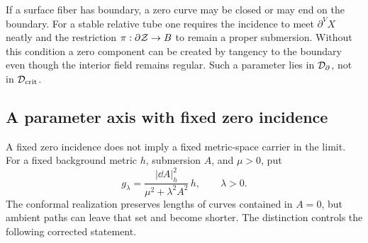 If a surface fiber has boundary, a zero curve may be closed or may end on the
boundary.  For a stable relative tube one requires the incidence to meet
$\partial^VX$ neatly and the restriction
$\pi:\partial\mathcal Z\to B$ to remain a proper submersion.  Without this condition a
zero component can be created by tangency to the boundary even though the interior
field remains regular.  Such a parameter lies in $\mathcal D_\partial$, not in
$\mathcal D_{\mathrm{crit}}$.

\subsection{A parameter axis with fixed zero incidence}
\label{subsec:intensity-collapse}

A fixed zero incidence does not imply a fixed metric-space carrier in the limit.
For a fixed background metric $h$, submersion $A$, and $\mu>0$, put
\begin{equation}
 g_\lambda=\frac{|\dd A|_h^2}{\mu^2+\lambda^2A^2}\,h,
 \qquad \lambda>0.
 \label{eq:intensity-collapse-metric}
\end{equation}
The conformal realization preserves lengths of curves contained in $A=0$, but
ambient paths can leave that set and become shorter.  The distinction controls
the following corrected statement.


